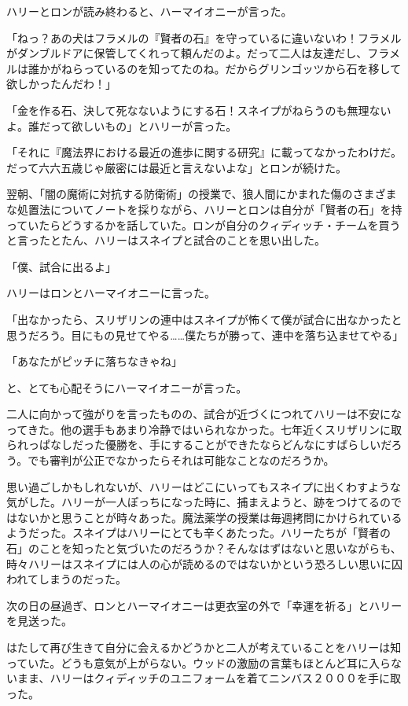 \documentclass[10pt,a4paper]{article}
\begin{document}
\begin{CJK}{UTF8}{min}
ハリーとロンが読み終わると、ハーマイオニーが言った。

「ねっ？あの犬はフラメルの『賢者の石』を守っているに違いないわ！フラメルがダンブルドアに保管してくれって頼んだのよ。だって二人は友達だし、フラメルは誰かがねらっているのを知ってたのね。だからグリンゴッツから石を移して欲しかったんだわ！」

「金を作る石、決して死なないようにする石！スネイプがねらうのも無理ないよ。誰だって欲しいもの」とハリーが言った。

「それに『魔法界における最近の進歩に関する研究』に載ってなかったわけだ。だって六六五歳じゃ厳密には最近と言えないよな」とロンが続けた。



翌朝、「闇の魔術に対抗する防衛術」の授業で、狼人間にかまれた傷のさまざまな処置法についてノートを採りながら、ハリーとロンは自分が「賢者の石」を持っていたらどうするかを話していた。ロンが自分のクィディッチ・チームを買うと言ったとたん、ハリーはスネイプと試合のことを思い出した。

「僕、試合に出るよ」

ハリーはロンとハーマイオニーに言った。

「出なかったら、スリザリンの連中はスネイプが怖くて僕が試合に出なかったと思うだろう。目にもの見せてやる……僕たちが勝って、連中を落ち込ませてやる」

「あなたがピッチに落ちなきゃね」

と、とても心配そうにハーマイオニーが言った。



二人に向かって強がりを言ったものの、試合が近づくにつれてハリーは不安になってきた。他の選手もあまり冷静ではいられなかった。七年近くスリザリンに取られっぱなしだった優勝を、手にすることができたならどんなにすばらしいだろう。でも審判が公正でなかったらそれは可能なことなのだろうか。

思い過ごしかもしれないが、ハリーはどこにいってもスネイプに出くわすような気がした。ハリーが一人ぽっちになった時に、捕まえようと、跡をつけてるのではないかと思うことが時々あった。魔法薬学の授業は毎週拷問にかけられているようだった。スネイプはハリーにとても辛くあたった。ハリーたちが「賢者の石」のことを知ったと気づいたのだろうか？そんなはずはないと思いながらも、時々ハリーはスネイプには人の心が読めるのではないかという恐ろしい思いに囚われてしまうのだった。



次の日の昼過ぎ、ロンとハーマイオニーは更衣室の外で「幸運を祈る」とハリーを見送った。

はたして再び生きて自分に会えるかどうかと二人が考えていることをハリーは知っていた。どうも意気が上がらない。ウッドの激励の言葉もほとんど耳に入らないまま、ハリーはクィディッチのユニフォームを着てニンバス２０００を手に取った。


\end{CJK}
\end{document}
